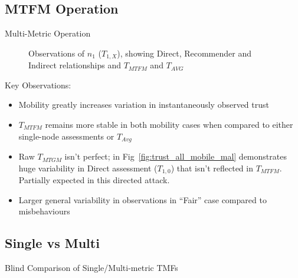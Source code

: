 \documentclass{beamer}
\begin{document}
\subsection{MTFM Operation}

\begin{frame}[allowframebreaks]{Multi-Metric Operation}
  \setcounter{subfigure}{0}%
  \begin{figure}[htp]
    \centering
    \hfil
    \hfil
    \hfil

    \hfil
    \hfil
    \hfil
    \caption{Observations of $n_1$ ($T_{1,X}$), showing Direct, Recommender and Indirect relationships and $T_{MTFM}$ and $T_{AVG}$\hyperlink{fig:trust_mobility_closeup}{}}
    \label{fig:trust_mobility}
  \end{figure}
\framebreak
Key Observations: 
  \begin{itemize}
    \item Mobility greatly increases variation in instantaneously observed trust
    \item $T_{MTFM}$ remains more stable in both mobility cases when compared to either single-node assessments or $T_{Avg}$
    \item Raw $T_{MTGM}$ isn't perfect; in Fig~\ref{fig:trust_all_mobile_mal} demonstrates huge variability in Direct assessment ($T_{1,0}$) that isn't reflected in $T_{MTFM}$. Partially expected in this directed attack.
    \item Larger general variability in observations in ``Fair'' case compared to misbehaviours
  \end{itemize}
\end{frame}

\subsection{Single vs Multi}{Blind Comparison of Single/Multi-metric TMFs}
\end{document}
